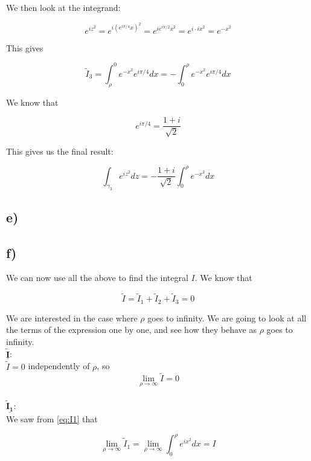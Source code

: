 \documentclass[a4paper,norsk, 10pt]{article}
\begin{document}
We then look at the integrand:

$$
e^{iz^2} = e^{i(e^{i\pi/4}x)^2} = e^{ie^{i\pi/2}x^2} = e^{i\cdot ix^2} = e^{-x^2}
$$

This gives 

$$
\tilde{I}_3 = \int_{\rho}^0 e^{-x^2} e^{i\pi /4} dx = - \int_0^{\rho} e^{-x^2} e^{i\pi /4} dx
$$

We know that 

$$
e^{i\pi/4} =\frac{1+i}{\sqrt{2}}
$$

This gives us the final result:

\begin{equation}
\int_{\gamma_3}e^{iz^2} dz = -\frac{1+i}{\sqrt{2}}\int_0^{\rho}e^{-x^2}dx
\label{eq:I3}
\end{equation}



\subsection*{e)}

\subsection*{f)}

We can now use all the above to find the integral $I$. We know that

$$
\tilde{I} = \tilde{I}_1 + \tilde{I}_2 + \tilde{I}_3 = 0
$$

We are interested in the case where $\rho$ goes to infinity. We are going to look at all the terms of the expression one by one, and see how they behave as $\rho$ goes to infinity.\\

$\underline{\mathbf{\tilde{I}}}$:\\

$\tilde{I} = 0$ independently of $\rho$, so
\begin{equation}
\lim_{\rho \rightarrow \infty} \tilde{I} = 0
\label{eq:IrhoInf}
\end{equation}\\

$\underline{\mathbf{\tilde{I}_1}}$:\\

We saw from \ref{eq:I1} that

\begin{equation}
\lim_{\rho \rightarrow \infty} \tilde{I}_1 = \lim_{\rho \rightarrow \infty} \int_0^{\rho} e^{ix^2} dx = I
\label{eq:I1rhoInf}
\end{equation}\\
\end{document}
